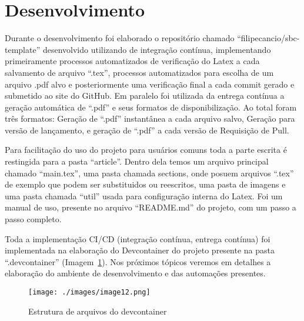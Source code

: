 \section{Desenvolvimento}

Durante o desenvolvimento foi elaborado o repositório chamado ``filipecancio/sbc-template'' desenvolvido utilizando de integração contínua, implementando primeiramente processos automatizados de verificação do Latex a cada salvamento de arquivo ``.tex'', processos automatizados para escolha de um arquivo .pdf alvo e posteriormente uma verificação final a cada commit gerado e submetido ao site do GitHub. Em paralelo foi utilizada da entrega contínua a geração automática de ``.pdf'' e seus formatos de disponibilização. Ao total foram três formatos: Geração de ``.pdf'' instantânea a cada arquivo salvo, Geração para versão de lançamento, e geração de ``.pdf'' a cada versão de Requisição de Pull.

Para facilitação do uso do projeto para usuários comuns toda a parte escrita é restingida para a pasta ``article''. Dentro dela temos um arquivo principal chamado ``main.tex'', uma pasta chamada sections, onde posuem arquivos ``.tex'' de exemplo que podem ser substituidos ou reescritos, uma pasta de imagens e uma pasta chamada ``util'' usada para configuração interna do Latex.
Foi um manual de uso, presente no arquivo ``README.md'' do projeto, com um passo a passo completo.

Toda a implementação CI/CD (integração contínua, entrega contínua) foi implementada na elaboração do Devcontainer do projeto presente na pasta ``.devcontainer'' (Imagem~\ref{fig:image12}). Nos próximos tópicos veremos em detalhes a elaboração do ambiente de desenvolvimento e das automações
presentes.

\begin{figure}[ht]
	\centering
	\texttt{[image: ./images/image12.png]}
	\caption{Estrutura de arquivos do devcontainer}
	\label{fig:image12}
\end{figure}